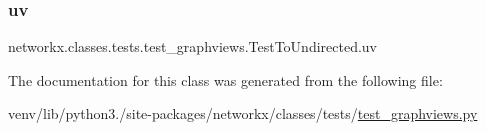 \subsubsection{\texorpdfstring{uv}{uv}}
{\footnotesize\ttfamily networkx.\+classes.\+tests.\+test\+\_\+graphviews.\+Test\+To\+Undirected.\+uv}



The documentation for this class was generated from the following file\+:\begin{DoxyCompactItemize}
\item 
venv/lib/python3./site-\/packages/networkx/classes/tests/\hyperlink{test__graphviews_8py}{test\+\_\+graphviews.\+py}\end{DoxyCompactItemize}
